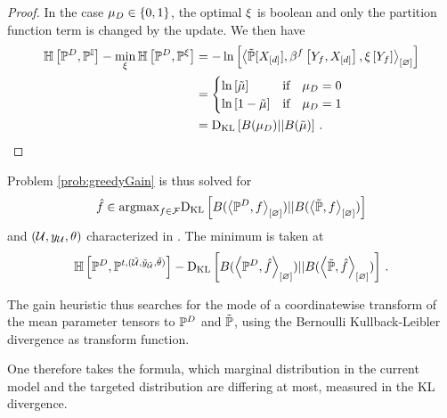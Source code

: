 \begin{proof}
    In the case $\mu_{D}\in\{0,1\}$, the optimal $\xi$ is boolean and only the partition function term is changed by the update.
    We then have
    \begin{align*}
        \centropyof{\empdistribution}{\probof{\ones}} - \min_{\acttensor} \centropyof{\empdistribution}{\probof{\acttensor}}
        &= - \lnof{\contraction{\secprobwith,\formulaccwith,\acttensorat{\formulavar}}} \\
        &= \begin{cases}
               \lnof{\currentmean} & \ifspace \datamean=0 \\
               \lnof{1-\currentmean} & \ifspace \datamean=1 \\
        \end{cases} \\
        &= \kldivof{\bernoulliof{\datamean}}{\bernoulliof{\currentmean}} \, . \qedhere
    \end{align*}
\end{proof}

Problem \eqref{prob:greedyGain} is thus solved for
\begin{align*}
    \hat{f} \in \mathrm{argmax}_{f\in\mathcal{F}} \mathrm{D}_{\mathrm{KL}}\left[ B(\left\langle \mathbb{P}^{D},f\right\rangle_{\left[ \varnothing \right]}) || B(\left\langle \tilde{\mathbb{P}},f\right\rangle_{\left[ \varnothing \right]}) \right]
\end{align*}
and $(\mathcal{U},y_{\mathcal{U}},\theta)$ characterized in .
The minimum is taken at
\begin{align*}
    \mathbb{H}\left[\mathbb{P}^{D},\mathbb{P}^{t,(\tilde{\mathcal{U}},\tilde{y}_{\tilde{\mathcal{U}}},\tilde{\theta})}\right]
    - \mathrm{D}_{\mathrm{KL}}\left[ B(\left\langle \mathbb{P}^{D},\hat{f}\right\rangle_{\left[ \varnothing \right]}) || B(\left\langle \tilde{\mathbb{P}},\hat{f}\right\rangle_{\left[ \varnothing \right]}) \right] \, .
\end{align*}

The gain heuristic thus searches for the mode of a coordinatewise transform of the mean parameter tensors to $\mathbb{P}^{D}$ and $\tilde{\mathbb{P}}$, using the Bernoulli Kullback-Leibler divergence as transform function.

One therefore takes the formula, which marginal distribution in the current model and the targeted distribution are differing at most, measured in the KL divergence.



